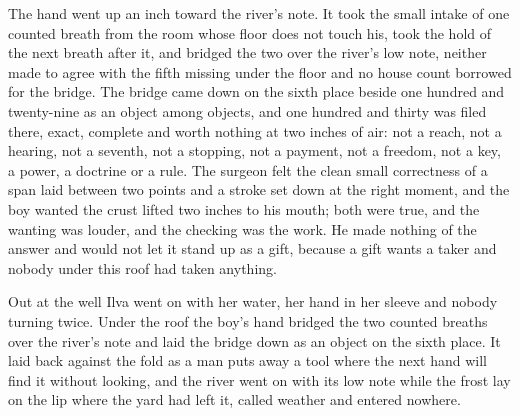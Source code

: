 The hand went up an inch toward the river's note. It took the small intake of one counted breath from the room whose floor does not touch his, took the hold of the next breath after it, and bridged the two over the river's low note, neither made to agree with the fifth missing under the floor and no house count borrowed for the bridge. The bridge came down on the sixth place beside one hundred and twenty-nine as an object among objects, and one hundred and thirty was filed there, exact, complete and worth nothing at two inches of air: not a reach, not a hearing, not a seventh, not a stopping, not a payment, not a freedom, not a key, a power, a doctrine or a rule. The surgeon felt the clean small correctness of a span laid between two points and a stroke set down at the right moment, and the boy wanted the crust lifted two inches to his mouth; both were true, and the wanting was louder, and the checking was the work. He made nothing of the answer and would not let it stand up as a gift, because a gift wants a taker and nobody under this roof had taken anything.

Out at the well Ilva went on with her water, her hand in her sleeve and nobody turning twice. Under the roof the boy's hand bridged the two counted breaths over the river's note and laid the bridge down as an object on the sixth place. It laid back against the fold as a man puts away a tool where the next hand will find it without looking, and the river went on with its low note while the frost lay on the lip where the yard had left it, called weather and entered nowhere.
